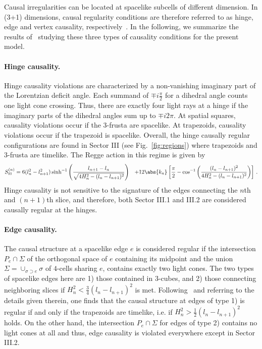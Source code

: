 Causal irregularities can be located at spacelike subcells of different dimension. In (3+1) dimensions, causal regularity conditions are therefore referred to as hinge, edge and vertex causality, respectively~\cite{Asante:2021phx}. In the following, we summarize the results of~\cite{Jercher:2023csk} studying these three types of causality conditions for the present model.

\paragraph{Hinge causality.} Hinge causality violations are characterized by a non-vanishing imaginary part of the Lorentzian deficit angle. Each summand of $\mp i\frac{\pi}{2}$ for a dihedral angle counts one light cone crossing. Thus, there are exactly four light rays at a hinge if the imaginary parts of the dihedral angles sum up to $\mp i2\pi$. At spatial squares, causality violations occur if the 3-frusta are spacelike. At trapezoids, causality violations occur if the trapezoid is spacelike. Overall, the hinge causally regular configurations are found in Sector III (see Fig.~\ref{fig:regions}) where trapezoids and $3$-frusta are timelike. The Regge action in this regime is given by
%
\begin{equation}\label{eq:regular Regge action}
\begin{aligned}
S_{\textsc{iii}}^{(n)} & = 6(l_n^2-l_{n+1}^2)\sinh^{-1}\left(\frac{l_{n+1}-l_n}{\sqrt{4H_n^2-(l_n-l_{n+1})^2}}\right)
& + 12\abs{k_n}\left[\frac{\pi}{2}-\cos^{-1}\left(\frac{(l_n-l_{n+1})^2}{4H_n^2-(l_n-l_{n+1})^2}\right)\right]\,.
\end{aligned}
\end{equation}  
%
Hinge causality is not sensitive to the signature of the edges connecting the $n$th and $(n+1)$th slice, and therefore, both Sector III.1 and III.2 are considered causally regular at the hinges.  

\paragraph{Edge causality.} The causal structure at a spacelike edge $e$ is considered regular if the intersection $P_e\cap\Sigma$ of the orthogonal space of $e$ containing its midpoint and the union $\Sigma = \cup_{\sigma\supset e}\sigma$ of $4$-cells sharing $e$, contains exactly two light cones. The two types of spacelike edges here are 1) those contained in $3$-cubes, and 2) those connecting neighboring slices if $H_n^2<\frac{3}{4}(l_n-l_{n+1})^2$ is met. Following~\cite{Jercher:2023csk} and referring to the details given therein, one finds that the causal structure at edges of type 1) is regular if and only if the trapezoids are timelike, i.e. if $H_n^2 > \frac{1}{2}(l_n-l_{n+1})^2$ holds. On the other hand, the intersection $P_e\cap\Sigma$ for edges of type 2) contains no light cones at all and thus, edge causality is violated everywhere except in Sector III.2.

